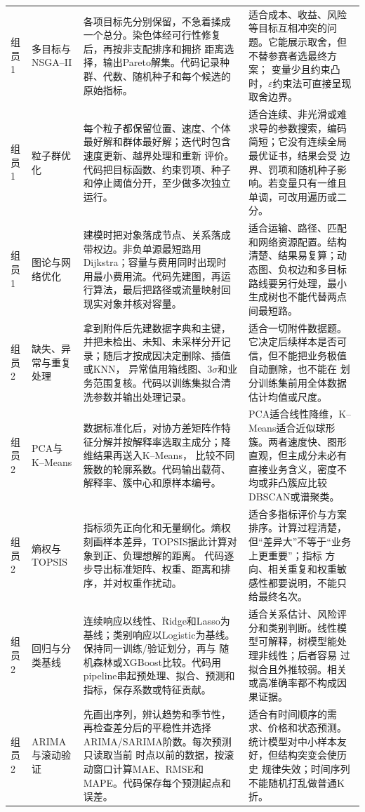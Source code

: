 \documentclass[UTF8,zihao=-4]{ctexart}
\begin{document}
\begin{longtable}{p{1.25cm}p{2.55cm}p{6.25cm}p{5.45cm}}
组员1 & 多目标与NSGA--II
& 各项目标先分别保留，不急着揉成一个总分。染色体经可行性修复后，再按非支配排序和拥挤
距离选择，输出Pareto解集。代码记录种群、代数、随机种子和每个候选的原始指标。
& 适合成本、收益、风险等目标互相冲突的问题。它能展示取舍，但不替参赛者选最终方案；
变量少且约束凸时，$\varepsilon$约束法可直接呈现取舍边界。\\

组员1 & 粒子群优化
& 每个粒子都保留位置、速度、个体最好解和群体最好解；迭代时包含速度更新、越界处理和重新
评价。代码把目标函数、约束罚项、种子和停止阈值分开，至少做多次独立运行。
& 适合连续、非光滑或难求导的参数搜索，编码简短；它没有连续全局最优证书，结果会受
边界、罚项和随机种子影响。若变量只有一维且单调，可改用遍历或二分。\\

组员1 & 图论与网络优化
& 建模时把对象落成节点、关系落成带权边。非负单源最短路用Dijkstra；容量与费用同时出现时
用最小费用流。代码先建图，再运行算法，最后把路径或流量映射回现实对象并核对容量。
& 适合运输、路径、匹配和网络资源配置。结构清楚、结果易复算；动态图、负权边和多目标
路线要另行处理，最小生成树也不能代替两点间最短路。\\

组员2 & 缺失、异常与重复处理
& 拿到附件后先建数据字典和主键，并把未检出、未知、未采样分开记录；随后才按成因决定删除、插值或KNN，
异常值用箱线图、$3\sigma$和业务范围复核。代码以训练集拟合清洗参数并输出处理记录。
& 适合一切附件数据题。它决定后续样本是否可信，但不能把业务极值自动删除，也不能在
划分训练集前用全体数据估计均值或尺度。\\

组员2 & PCA与K--Means
& 数据标准化后，对协方差矩阵作特征分解并按解释率选取主成分；降维结果再送入K--Means，
比较不同簇数的轮廓系数。代码输出载荷、解释率、簇中心和原样本编号。
& PCA适合线性降维，K--Means适合近似球形簇。两者速度快、图形直观，但主成分未必有
直接业务含义，密度不均或非凸簇应比较DBSCAN或谱聚类。\\

组员2 & 熵权与TOPSIS
& 指标须先正向化和无量纲化。熵权刻画样本差异，TOPSIS据此计算对象到正、负理想解的距离。
代码逐步导出标准矩阵、权重、距离和排序，并对权重作扰动。
& 适合多指标评价与方案排序。计算过程清楚，但“差异大”不等于“业务上更重要”；指标
方向、相关重复和权重敏感性都要说明，不能只给最终名次。\\

组员2 & 回归与分类基线
& 连续响应以线性、Ridge和Lasso为基线；类别响应以Logistic为基线。保持同一训练/验证划分，再与
随机森林或XGBoost比较。代码用pipeline串起预处理、拟合、预测和指标，保存系数或特征贡献。
& 适合关系估计、风险评分和类别判断。线性模型可解释，树模型能处理非线性；后者容易
过拟合且外推较弱。相关或高准确率都不构成因果证据。\\

组员2 & ARIMA与滚动验证
& 先画出序列，辨认趋势和季节性，再检查差分后的平稳性并选择ARIMA/SARIMA阶数。每次预测只读取当前
时点以前的数据，按滚动窗口计算MAE、RMSE和MAPE。代码保存每个预测起点和误差。
& 适合有时间顺序的需求、价格和状态预测。统计模型对中小样本友好，但结构突变会使历史
规律失效；时间序列不能随机打乱做普通K折。\\
\end{longtable}
\normalsize
\end{document}

